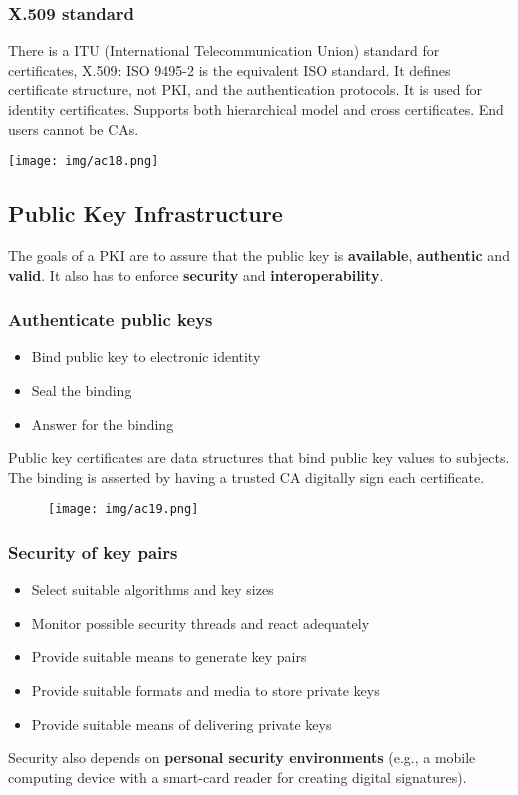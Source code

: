 \documentclass[a4paper, 10pt, titlepage]{article}
\begin{document}
\subsubsection*{X.509 standard}
There is a ITU (International Telecommunication Union) standard for certificates, X.509: ISO 9495-2 is the equivalent ISO standard. It defines certificate structure, not PKI, and the authentication protocols. It is used for identity certificates.
Supports both hierarchical model and cross certificates. End users cannot be CAs.
\begin{center}
\texttt{[image: img/ac18.png]}
\end{center}


\subsection{Public Key Infrastructure}
The goals of a PKI are to assure that the public key is \textbf{available}, \textbf{authentic} and \textbf{valid}. It also has to enforce \textbf{security} and \textbf{interoperability}.

\subsubsection{Authenticate public keys}
\begin{itemize}
\item Bind public key to electronic identity
\item Seal the binding
\item Answer for the binding
\end{itemize}
Public key certificates are data structures that bind public key values to subjects. The binding is asserted by having a trusted CA digitally sign each certificate.
\begin{figure}[h]
\centering
\texttt{[image: img/ac19.png]}
\end{figure}

\subsubsection{Security of key pairs}
\begin{itemize}
\item Select suitable algorithms and key sizes
\item Monitor possible security threads and react adequately
\item Provide suitable means to generate key pairs
\item Provide suitable formats and media to store private keys
\item Provide suitable means of delivering private keys
\end{itemize}
Security also depends on \textbf{personal security environments} (e.g., a mobile computing device with a smart-card reader for creating digital signatures).
\end{document}
